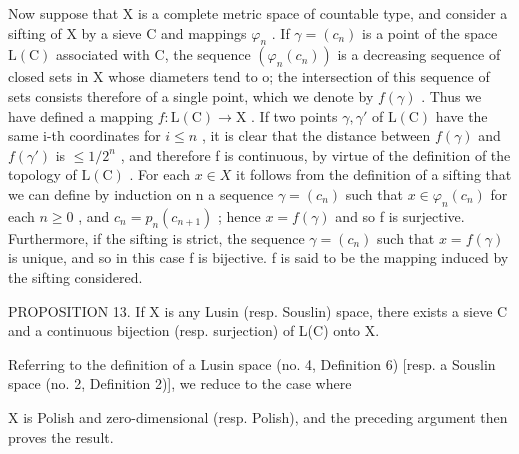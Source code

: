 Now suppose that X is a complete metric space of countable type, and consider a sifting of X by a sieve C and mappings \(\varphi_{n}\) . If \(\gamma = (c_{n})\) is a point of the space \(\mathrm{L}(\mathrm{C})\) associated with C, the sequence \((\varphi_{n}(c_{n}))\) is a decreasing sequence of closed sets in X whose diameters tend to o; the intersection of this sequence of sets consists therefore of a single point, which we denote by \(f(\gamma)\) . Thus we have defined a mapping \(f: \mathrm{L}(\mathrm{C}) \to \mathrm{X}\) . If two points \(\gamma, \gamma'\) of \(\mathrm{L}(\mathrm{C})\) have the same i-th coordinates for \(i \leqslant n\) , it is clear that the distance between \(f(\gamma)\) and \(f(\gamma')\) is \(\leqslant 1/2^{n}\) , and therefore f is continuous, by virtue of the definition of the topology of \(\mathrm{L}(\mathrm{C})\) . For each \(x \in X\) it follows from the definition of a sifting that we can define by induction on n a sequence \(\gamma = (c_{n})\) such that \(x \in \varphi_{n}(c_{n})\) for each \(n \geqslant 0\) , and \(c_{n} = p_{n}(c_{n+1})\) ; hence \(x = f(\gamma)\) and so f is surjective. Furthermore, if the sifting is strict, the sequence \(\gamma = (c_{n})\) such that \(x = f(\gamma)\) is unique, and so in this case f is bijective. f is said to be the mapping induced by the sifting considered.

PROPOSITION 13. If X is any Lusin (resp. Souslin) space, there exists a sieve C and a continuous bijection (resp. surjection) of L(C) onto X.

Referring to the definition of a Lusin space (no. 4, Definition 6) {[}resp. a Souslin space (no. 2, Definition 2){]}, we reduce to the case where

X is Polish and zero-dimensional (resp. Polish), and the preceding argument then proves the result.

